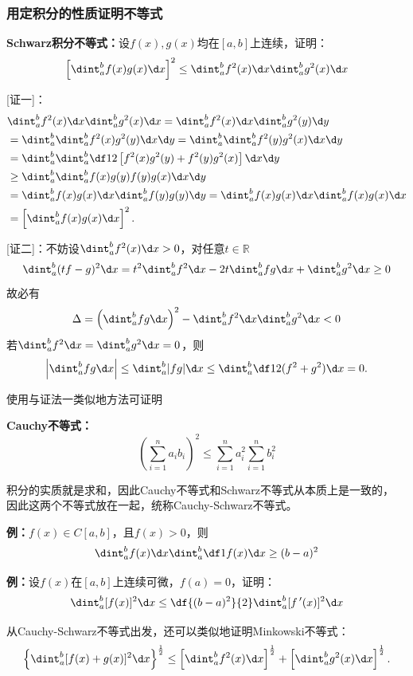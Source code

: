 \subsubsection{用定积分的性质证明不等式}

\begin{thx}
	{\bf Schwarz积分不等式：}设$f(x),g(x)$均在$[a,b]$上连续，证明：
	$$\left[\dint_a^bf(x)g(x)\d x\right]^2
	\leq\dint_a^bf^2(x)\d x\dint_a^bg^2(x)\d x$$
\end{thx}

[证一]：
\begin{align*}
	&\dint_a^bf^2(x)\d x\dint_a^bg^2(x)\d x
	=\dint_a^bf^2(x)\d x\dint_a^bg^2(y)\d y\\
	&=\dint_a^b\dint_a^bf^2(x)g^2(y)\d x\d y
	=\dint_a^b\dint_a^bf^2(y)g^2(x)\d x\d y\\
	&=\dint_a^b\dint_a^b\df12\left[f^2(x)g^2(y)
	+f^2(y)g^2(x)\right]\d x\d y\\
	&\geq \dint_a^b\dint_a^bf(x)g(y)
	f(y)g(x)\d x\d y\\
	&=\dint_a^bf(x)g(x)\d x\dint_a^bf(y)g(y)\d y
	=\dint_a^bf(x)g(x)\d x\dint_a^bf(x)g(x)\d x\\
	&=\left[\dint_a^bf(x)g(x)\d x\right]^2.
\end{align*}
\fin

[证二]：不妨设$\dint_a^bf^2(x)\d x>0$，对任意$t\in\mathbb{R}$
$$\dint_a^b(tf-g)^2\d x=t^2\dint_a^bf^2\d x-2t\dint_a^bfg\d x
+\dint_a^bg^2\d x\geq 0$$
故必有
$$\Delta=\left(\dint_a^bfg\d x\right)^2-\dint_a^bf^2\d x\dint_a^b
g^2\d x<0$$
若$\dint_a^bf^2\d x=\dint_a^b g^2\d x=0$，则
$$\left|\dint_a^bfg\d x\right|\leq\dint_a^b|fg|\d x
\leq\dint_a^b\df12(f^2+g^2)\d x=0.$$
\fin

使用与证法一类似地方法可证明
\begin{thx}
	{\bf Cauchy不等式：}
	$$\left(\sum\limits_{i=1}^na_ib_i\right)^2\leq
	\sum\limits_{i=1}^na_i^2\sum\limits_{i=1}^nb_i^2$$
\end{thx}
积分的实质就是求和，因此Cauchy不等式和Schwarz不等式从本质上是一致的，
因此这两个不等式放在一起，统称{\kaishu Cauchy-Schwarz不等式}。

{\bf 例：}$f(x)\in C[a,b]$，且$f(x)>0$，则
$$\dint_a^bf(x)\d x\dint_a^b\df1{f(x)}\d x\geq(b-a)^2$$

{\bf 例：}设$f(x)$在$[a,b]$上连续可微，$f(a)=0$，证明：
$$\dint_a^b[f(x)]^2\d x\leq\df{(b-a)^2}{2}\dint_a^b[f\,'(x)]^2\d x$$

从Cauchy-Schwarz不等式出发，还可以类似地证明{\kaishu Minkowski不等式}：
$$\left\{\dint_a^b[f(x)+g(x)]^2\d x\right\}^{\frac12}
\leq\left[\dint_a^bf^2(x)\d x\right]^{\frac12}
+\left[\dint_a^bg^2(x)\d x\right]^{\frac12}.$$

